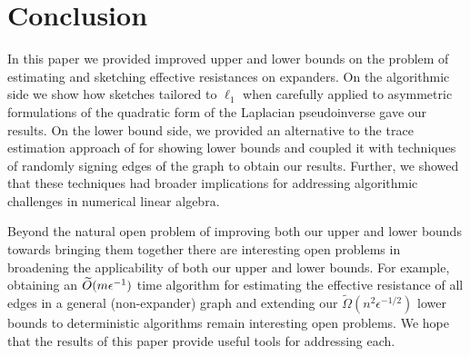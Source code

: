 \section{Conclusion}
\label{sec:conclude}

In this paper we provided improved upper and lower bounds on the problem of estimating and sketching effective resistances on expanders. On the algorithmic side we show how sketches tailored to $\ell_1$ when carefully applied to asymmetric formulations of the quadratic form of the Laplacian pseudoinverse gave our results. On the lower bound side, we provided an alternative to the trace estimation approach of \cite{musco2017spectrum} for showing lower bounds and coupled it with techniques of randomly signing edges of the graph to obtain our results. Further, we showed that these techniques had broader implications for addressing algorithmic challenges in numerical linear algebra. 

Beyond the natural open problem of improving both our upper and lower bounds towards bringing them together there are interesting open problems in broadening the applicability of both our upper and lower bounds. For example, obtaining an $\widetilde{O}( {m \epsilon^{-1}} )$ time algorithm for estimating the effective resistance of all edges in a general (non-expander) graph and extending our $\widetilde{\Omega}(n^2 \epsilon^{-1/2})$ lower bounds to deterministic algorithms remain interesting open problems. We hope that the results of this paper provide useful tools for addressing each. 

